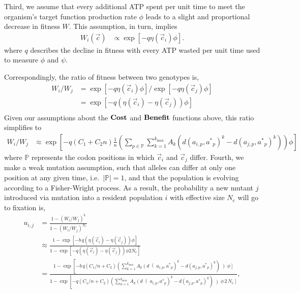 \documentclass{article}
\newcommand{\Cost}{\ensuremath{\text{\textbf{Cost}}}\xspace}
\newcommand{\Func}{\ensuremath{\text{\textbf{Benefit}}}\xspace}
\newcommand{\Ne}{\ensuremath{{N_e}}\xspace} %
\newcommand{\aip}{\ensuremath{a_{i,p}}\xspace}
\newcommand{\ajp}{\ensuremath{a_{j,p}}\xspace}
\newcommand{\aoptp}{\ensuremath{\aopt_p}\xspace}
\newcommand{\aopt}{\ensuremath{a^*}\xspace}
\newcommand{\cveci}{\ensuremath{\cvec_i}\xspace}
\newcommand{\cvecj}{\ensuremath{\cvec_j}\xspace}
\newcommand{\cvec}{\ensuremath{\Vec{c}}\xspace}
\newcommand{\kmax}{\ensuremath{{k_{\max}}}\xspace}
\newcommand{\setP}{\ensuremath{\mathbb{P}}\xspace}
\begin{document}
\begin{itemize}
Third, we assume that every additional ATP spent per unit time to meet the organism's target function production rate $\phi$ leads to a slight and proportional decrease in fitness $W$.
This assumption, in turn, implies 
\begin{align}
  W_i\left(\cvec\right) &\propto \exp\left[- q \eta(\cveci) \phi\right].
\end{align}
where $q$ describes the decline in fitness with every ATP wasted per unit time used to measure $\phi$ and $\psi$.

Correspondingly, the ratio of fitness between two genotypes is,
\begin{align*}
  W_i/W_j &=  \exp\left[- q \eta(\cveci) \phi\right]/\exp\left[- q \eta(\cvecj) \phi\right]\\
  &=  \exp\left[- q \left(\eta(\cveci)- \eta(\cvecj)\right) \phi\right]\\
\end{align*}
Given our assumptions about the \Cost and \Func functions above, this ratio simplifies to
\begin{align}
  W_i/W_j &\approx \exp\left[- q \left(C_1 + C_2 n\right) \frac{1}{n}\left(\sum_{p \in \setP} \sum_{k=1}^\kmax A_k \left(d\left(\aip,\aoptp\right)^k - d\left(\ajp,\aoptp\right)^k\right)\right) \phi \right]
\end{align}
where \setP represents the codon positions in which \cveci and \cvecj differ.
Fourth, we make a weak mutation assumption, such that alleles can differ at only one position at any given time, i.e.~$|\setP| = 1$, and that the population is evolving according to a Fisher-Wright process.
As a result, the probability a new mutant $j$ introduced via mutation into a resident population $i$ with effective size \Ne will go to fixation is,
\begin{align*}
  u_{i,j} &=  \frac{1 - \left(W_i/W_j\right)^b}{1 - \left(W_i/W_j\right)^\Ne}\\
   &\approx \frac{1-\exp\left[- b\,q \left(\eta(\cveci)- \eta(\cvecj)\right) \phi\right]}{1-\exp\left[- q \left(\eta(\cveci)- \eta(\cvecj)\right) \phi 2\Ne\right]}\\
   &= \frac{1- \exp\left[- b\,q \left(C_1/n + C_2\right)\left(\sum_{k=1}^\kmax A_k \left(d\right(\aip,\aoptp\right)^k - d\left(\ajp,\aoptp\right)^k\right)\left) \phi\right]}{1-\exp\left[- q \left(C_1/n + C_2\right)\left(\sum_{k=1}^\kmax A_k \left(d\right(\aip,\aoptp\right)^k - d\left(\ajp,\aoptp\right)^k\right)\left) \phi \, 2 \, \Ne\right]},

\end{align*}
\end{itemize}
\end{document}
